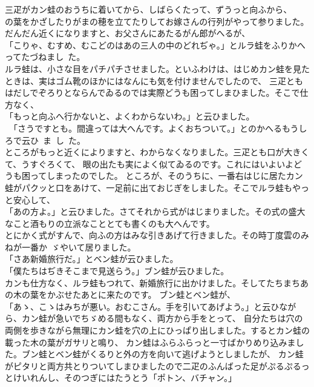 \documentclass[
a4paper,
10pt,
book]
{tarticle}
\begin{document}
\indent 三疋がカン蛙のおうちに着いてから、しばらくたって、ずうっと向ふから、\\
の葉をかざしたりがまの穂を立てたりしてお嫁さんの行列がやって参りました。\\
\indent だんだん近くになりますと、お父さんにあたるがん郎がへるが、\\
「こりゃ、むすめ、むこどのはあの三人の中のどれぢゃ。」とルラ蛙をふりかへってたづねまし~た。\\
\indent ルラ蛙は、小さな目をパチパチさせました。といふわけは、はじめカン蛙を見たときは、実はゴム靴のほかにはなんにも気を付けませんでしたので、
三疋ともはだしでぞろりとならんでゐるのでは実際どうも困ってしまひました。そこで仕方なく、\\
「もっと向ふへ行かないと、よくわからないわ。」と云ひました。\\
\, 「さうですとも。間違っては大へんです。よくおちついて。」とのかへるもうしろで云ひ~ま~し~た。\\
\indent ところがもっと近くによりますと、わからなくなりました。三疋とも口が大きくて、うすぐろくて、
眼の出たも実によく似てゐるのです。これにはいよいよどうも困ってしまったのでした。
ところが、そのうちに、一番右はじに居たカン蛙がパクッと口をあけて、一足前に出ておじぎをしました。そこでルラ蛙もやっと安心して、\\
「あの方よ。」と云ひました。さてそれから式がはじまりました。その式の盛大なこと酒もりの立派なこととても書くのも大へんです。\\
\indent とにかく式がすんで、向ふの方はみな引きあげて行きました。その時丁度雲のみねが一番か~ゞやいて居りました。\\
「さあ新婚旅行だ。」とベン蛙が云ひました。\\
「僕たちはぢきそこまで見送らう。」ブン蛙が云ひました。\\
\indent カンも仕方なく、ルラ蛙もつれて、新婚旅行に出かけました。そしてたちまちあの木の葉をかぶせたあとに来たのです。
ブン蛙とベン蛙が、\\
「あゝ、こゝはみちが悪い。おむこさん。手を引いてあげよう。」と云ひながら、カン蛙が急いでちゞめる間もなく、両方から手をとって、
自分たちは穴の両側を歩きながら無理にカン蛙を穴の上にひっぱり出しました。するとカン蛙の載った木の葉がガサリと鳴り、
カン蛙はふらふらっと一寸ばかりめり込みました。ブン蛙とベン蛙がくるりと外の方を向いて逃げようとしましたが、
カン蛙がピタリと両方共とりついてしまひましたので二疋のふんばった足がぷるぷるっとけいれんし、そのつぎにはたうとう「ポトン、バチャン。」\\
\end{document}
